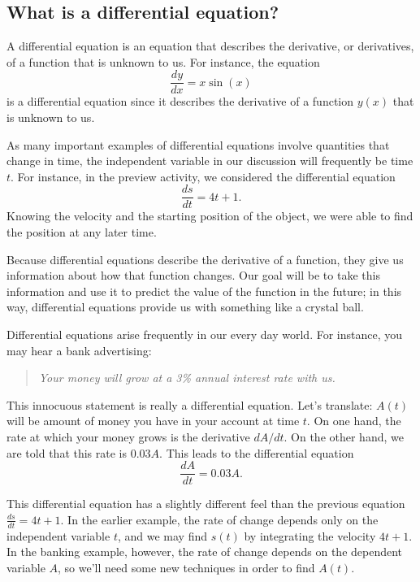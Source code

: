 
\subsection*{What is a differential equation?}  

A differential equation is an equation that describes the derivative, or derivatives, of a function that is unknown to us.  For instance, the equation
$$ \frac{dy}{dx} = x \sin(x) $$
is a differential equation since it describes the derivative of a function $y(x)$ that is unknown to us.

As many important examples of differential equations involve quantities that change in time, the independent variable in our discussion will frequently be time $t$. For instance, in the preview activity, we considered the differential equation
$$ \frac{ds}{dt} = 4t + 1. $$
Knowing the velocity and the starting position of the object, we were able to find the position at any later time.

Because differential equations describe the derivative of a function, they give us information about how that function changes.  Our goal will be to take this information and use it to predict the value of the function in the future; in this way, differential equations provide us with something like a crystal ball.

Differential equations arise frequently in our every day world.  For instance, you may hear a bank advertising:

\begin{quote}{\em Your money will grow at a 3\% annual interest rate with us.}\end{quote}

This innocuous statement is really a differential equation.  Let's translate:  $A(t)$ will be amount of money you have in your account at time $t$.  On one hand, the rate at which your money grows is the derivative $dA/dt$.  On the other hand, we are told that this rate is $0.03 A$.  This leads to the differential equation
$$ \frac{dA}{dt} = 0.03 A. $$

This differential equation has a slightly different feel than the previous equation $\frac{ds}{dt} = 4t+1$.  In the earlier example, the rate of change depends only on the independent variable $t$, and we may find $s(t)$ by integrating the velocity $4t+1$.   In the banking example, however, the rate of change depends on the dependent variable $A$, so we'll need some new techniques in order to find $A(t)$.  


